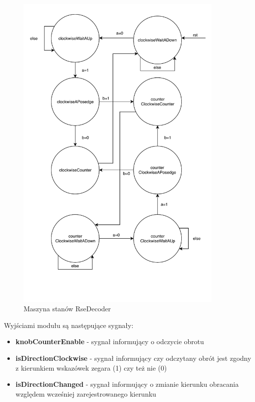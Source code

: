 \documentclass[12pt] {article}
\begin{document}
\begin{figure}[H]
\centering
\includegraphics[width=0.9\textwidth]{res/rse_fsm_diagram.pdf}
\caption{Maszyna stanów RseDecoder}
\label{fig:rsedec}
\end{figure}

Wyjściami modułu są następujące sygnały:
\begin{itemize}
\item \textbf{knobCounterEnable} - sygnał informujący o odczycie obrotu
\item \textbf{isDirectionClockwise} - sygnał informujący czy odczytany obrót jest zgodny z kierunkiem wskazówek zegara (1) czy też nie (0)
\item \textbf{isDirectionChanged} - sygnał informujący o zmianie kierunku obracania względem wcześniej zarejestrowanego kierunku
\end{itemize}
\end{document}
